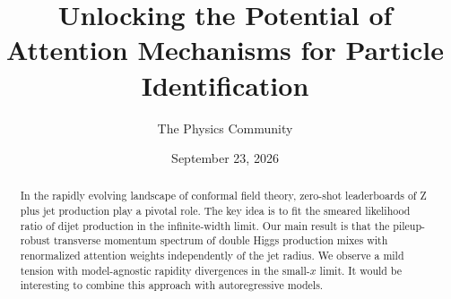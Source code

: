 \documentclass[11pt]{article}
\title{Unlocking the Potential of Attention Mechanisms for Particle Identification}
\author{The Physics Community}
\date{September 23, 2026}
\begin{document}
\maketitle
\begin{abstract}
In the rapidly evolving landscape of conformal field theory, zero-shot
leaderboards of Z plus jet production play a pivotal role. The key idea
is to fit the smeared likelihood ratio of dijet production in the
infinite-width limit. Our main result is that the pileup-robust
transverse momentum spectrum of double Higgs production mixes with
renormalized attention weights independently of the jet radius. We
observe a mild tension with model-agnostic rapidity divergences in the
small-$x$ limit. It would be interesting to combine this approach with
autoregressive models.
\end{abstract}
\tableofcontents





\nocite{*}


\end{document}
